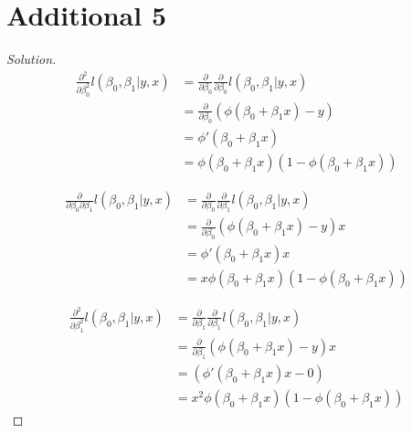 \documentclass{article}
\newenvironment{solution}
  {\renewcommand\qedsymbol{$\blacksquare$}\begin{proof}[Solution]$ $}
  {\end{proof}}
\begin{document}
\section{Additional 5}
\begin{solution}
\begin{align*}
\frac{\partial^2}{\partial \beta_0^2} l(\beta_0, \beta_1 | y, x) &= \frac{\partial}{\partial \beta_0} \frac{\partial}{\partial \beta_0} l(\beta_0, \beta_1 | y, x) \\
&= \frac{\partial}{\partial \beta_0} (\phi(\beta_0 + \beta_1 x) - y) \\
&= \phi'(\beta_0 + \beta_1 x) \\
&= \phi(\beta_0 + \beta_1 x)(1-\phi(\beta_0 + \beta_1 x))
\end{align*}

\begin{align*}
\frac{\partial}{\partial \beta_0 \partial \beta_1} l(\beta_0, \beta_1 | y, x) &= \frac{\partial}{\partial \beta_0} \frac{\partial}{\partial \beta_1} l(\beta_0, \beta_1 | y, x) \\
&= \frac{\partial}{\partial \beta_0} (\phi(\beta_0 + \beta_1 x) - y)x \\
&= \phi'(\beta_0 + \beta_1 x)x \\
&= x\phi(\beta_0 + \beta_1 x)(1-\phi(\beta_0 + \beta_1 x))
\end{align*}

\begin{align*}
\frac{\partial^2}{\partial \beta_1^2} l(\beta_0, \beta_1 | y, x) &= \frac{\partial}{\partial \beta_1} \frac{\partial}{\partial \beta_1} l(\beta_0, \beta_1 | y, x) \\
&= \frac{\partial}{\partial \beta_1} (\phi(\beta_0 + \beta_1 x) - y)x \\
&= (\phi'(\beta_0 + \beta_1 x)x - 0 ) \\
&= x^2\phi(\beta_0 + \beta_1 x)(1-\phi(\beta_0 + \beta_1 x))
\end{align*}

\end{solution}

\newpage
\end{document}
